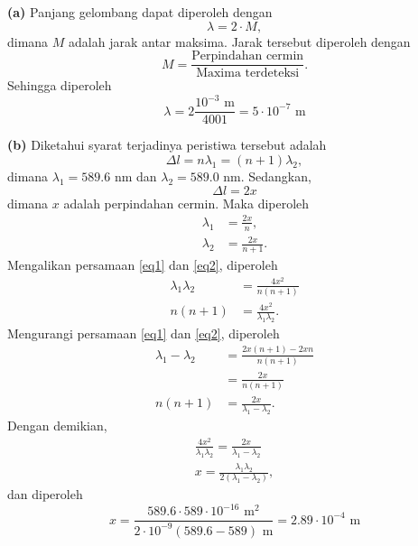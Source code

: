 \documentclass[../../../main.tex]{subfiles}
\begin{document}
\textbf{(a)} Panjang gelombang dapat diperoleh dengan 
\begin{equation*}
  \lambda=2\cdot M,
\end{equation*}
dimana $M$ adalah jarak antar maksima. Jarak tersebut diperoleh dengan 
\begin{equation*}
  M=\frac{\text{Perpindahan cermin}}{\text{Maxima terdeteksi}}.
\end{equation*}
Sehingga diperoleh 
\begin{equation*}
  \lambda=2\frac{10^{-3}\text{ m}}{4001}=\boxed{5\cdot10^{-7}\text{ m}}
\end{equation*}

\textbf{(b)} Diketahui syarat terjadinya peristiwa tersebut adalah 
\begin{equation*}
  \Delta l=n\lambda_1=(n+1)\lambda_2,
\end{equation*}
dimana $\lambda_1= 589.6 $ nm dan $\lambda_2=  589.0 $ nm. Sedangkan, 
\begin{equation*}
  \Delta l=2x
\end{equation*}
dimana $x$ adalah perpindahan cermin. Maka diperoleh 
\begin{align}
  \lambda_1&=\frac{2x}{n},\label{eq1}\\
  \lambda_2&=\frac{2x}{n+1}\label{eq2}.
\end{align}
Mengalikan persamaan \ref{eq1} dan \ref{eq2}, diperoleh
\begin{align*}
  \lambda_1\lambda_2&=\frac{4x^2}{n(n+1)}\\
  n(n+1)&=\frac{4x^2}{\lambda_1\lambda_2}.
\end{align*}
Mengurangi persamaan \ref{eq1} dan \ref{eq2}, diperoleh
\begin{align*}
  \lambda_1-\lambda_2&=\frac{2x(n+1)-2xn}{n(n+1)}\\
  &=\frac{2x}{n(n+1)}\\
  n(n+1)&=\frac{2x}{\lambda_1-\lambda_2}.
\end{align*}
Dengan demikian,
\begin{align*}
  \frac{4x^2}{\lambda_1\lambda_2}=\frac{2x}{\lambda_1-\lambda_2}\\
  x=\frac{\lambda_1\lambda_2}{2(\lambda_1-\lambda_2)},
\end{align*}
dan diperoleh
\begin{equation*}
  x=\frac{589.6\cdot 589\cdot10^{-16}\text{ m}^2}{2\cdot10^{-9}(589.6-589)\text{ m}}=\boxed{2.89\cdot10^{-4}\text{ m}}
\end{equation*}
\end{document}
